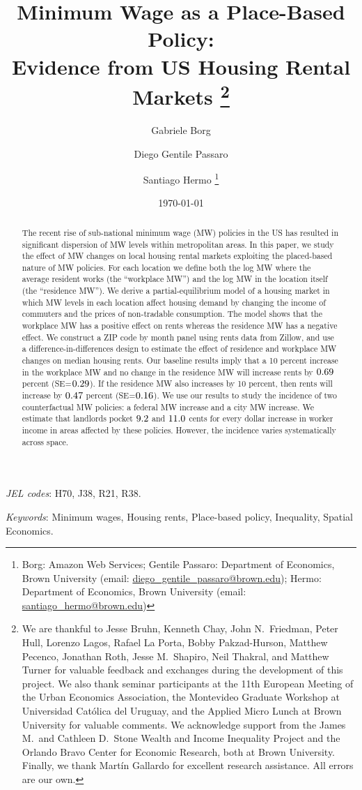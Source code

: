 \documentclass{article}
\title{ Minimum Wage as a Place-Based Policy: \\
        Evidence from US Housing Rental Markets%
        \thanks{We are thankful to Jesse Bruhn, Kenneth Chay, John N.\ Friedman, 
        Peter Hull, Lorenzo Lagos, Rafael La Porta, Bobby Pakzad-Hurson, 
        Matthew Pecenco, Jonathan Roth, Jesse M.\ Shapiro, Neil Thakral, 
        and Matthew Turner for valuable feedback and exchanges during the 
        development of this project.
        We also thank seminar participants at 
        the 11th European Meeting of the Urban Economics Association, 
        the Montevideo Graduate Workshop at Universidad Católica del Uruguay, and
        the Applied Micro Lunch at Brown University for valuable comments.
        We acknowledge support from 
        the James M.\ and Cathleen D.\ Stone Wealth and Income Inequality Project and 
        the Orlando Bravo Center for Economic Research, both at Brown University.
        Finally, we thank Martín Gallardo for excellent research assistance.
        All errors are our own.}}
\author{Gabriele Borg \and Diego Gentile Passaro \and Santiago Hermo%
        \footnote{Borg: Amazon Web Services;
        Gentile Passaro: Department of Economics, Brown University 
        (email: \url{diego_gentile_passaro@brown.edu}); 
        Hermo: Department of Economics, Brown University 
        (email: \url{santiago_hermo@brown.edu})}}
\date{\today}
\begin{document}

\maketitle

\begin{abstract}
    \noindent
    The recent rise of sub-national minimum wage (MW) policies in the US has 
    resulted in significant dispersion of MW levels within metropolitan areas.
    In this paper, we study the effect of MW changes on local housing rental 
    markets exploiting the placed-based nature of MW policies.
    For each location we define both
    the log MW where the average resident works (the ``workplace MW'')
    and the log MW in the location itself (the ``residence MW'').
    We derive a partial-equilibrium model of a housing market
    in which MW levels in each location affect housing demand by 
    changing the income of commuters and the prices of non-tradable consumption.
    The model shows that the workplace MW has a positive effect on rents 
    whereas the residence MW has a negative effect.
    We construct a ZIP code by month panel using rents data from Zillow, and
    use a difference-in-differences design to estimate the effect of 
    residence and workplace MW changes on median housing rents.
    Our baseline results imply that a
    10 percent increase in the workplace MW and 
    no change in the residence MW will increase rents by 
    $0.69$ percent (SE=$0.29$).
    If the residence MW also increases by 10 percent, then 
    rents will increase by $0.47$ percent (SE=$0.16$).
    We use our results to study the incidence of two counterfactual MW policies:
    a federal MW increase and a city MW increase.
    We estimate that landlords pocket $\textnormal{9.2}$ and 
    $\textnormal{11.0}$ cents for every dollar increase in worker
    income in areas affected by these policies.
    However, the incidence varies systematically across space.
\end{abstract}

\noindent \textit{JEL codes}: H70, J38, R21, R38.

\noindent \textit{Keywords}: Minimum wages, Housing rents, Place-based policy, Inequality, Spatial Economics.
\end{document}
